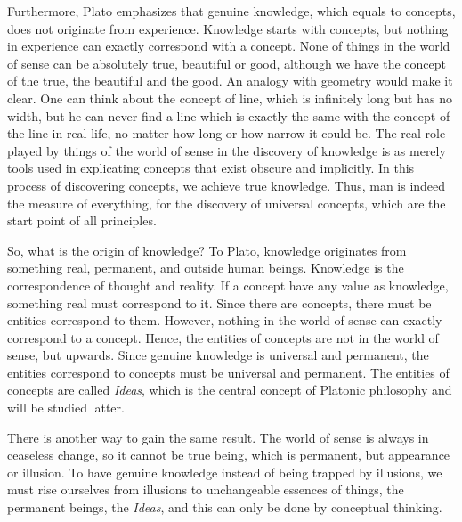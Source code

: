 \documentclass[11pt]{article}
\begin{document}
\newline

Furthermore, Plato emphasizes that genuine knowledge, which equals to concepts, does not originate from experience. 
Knowledge starts with concepts, but nothing in experience can exactly correspond with a concept. 
None of things in the world of sense can be absolutely true, beautiful or good, although we have the concept of the true, the beautiful and the good. 
An analogy with geometry would make it clear. 
One can think about the concept of line, which is infinitely long but has no width, but he can never find a line which is exactly the same with the concept of the line in real life, no matter how long or how narrow it could be. 
The real role played by things of the world of sense in the discovery of knowledge is as merely tools used in explicating concepts that exist obscure and implicitly. 
In this process of discovering concepts, we achieve true knowledge. 
Thus, man is indeed the measure of everything, for the discovery of universal concepts, which are the start point of all principles.

\newline

So, what is the origin of knowledge? 
To Plato, knowledge originates from something real, permanent, and outside human beings. 
Knowledge is the correspondence of thought and reality. 
If a concept have any value as knowledge, something real must correspond to it. 
Since there are concepts, there must be entities correspond to them. 
However, nothing in the world of sense can exactly correspond to a concept. 
Hence, the entities of concepts are not in the world of sense, but upwards. 
Since genuine knowledge is universal and permanent, the entities correspond to concepts must be universal and permanent. 
The entities of concepts are called \textit{Ideas}, which is the central concept of Platonic philosophy and will be studied latter.

\newline

There is another way to gain the same result. 
The world of sense is always in ceaseless change, so it cannot be true being, which is permanent, but appearance or illusion. 
To have genuine knowledge instead of being trapped by illusions, we must rise ourselves from illusions to unchangeable essences of things, the permanent beings, the \textit{Ideas}, and this can only be done by conceptual thinking.

\newline
\end{document}
